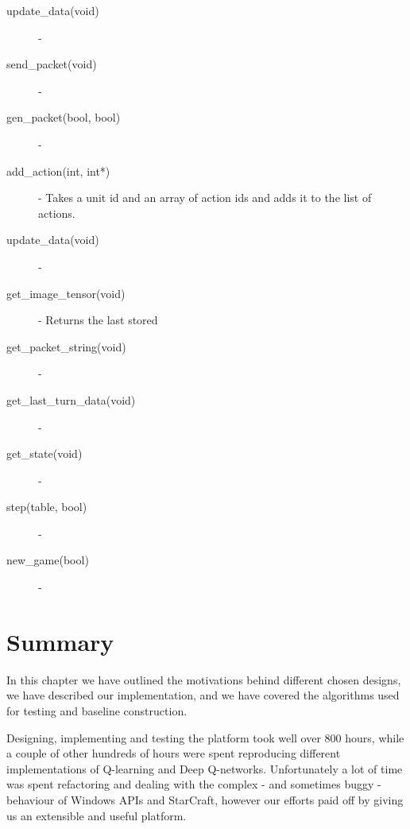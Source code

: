 \begin{description}
\item [update\_data(void)] -
\item [send\_packet(void)] -
\item [gen\_packet(bool, bool)] -
\item [add\_action(int, int*)] - Takes a unit id and an array of action ids and
  adds it to the list of actions.
\item [update\_data(void)] -
\item [get\_image\_tensor(void)] - Returns the last stored 
\item [get\_packet\_string(void)] -
\item [get\_last\_turn\_data(void)] -
\item [get\_state(void)] -
\item [step(table, bool)] -
\item [new\_game(bool)] -
\end{description}
 
\section{Summary}

In this chapter we have outlined the motivations behind different chosen
designs, we have described our implementation, and we have covered the algorithms
used for testing and baseline construction.

Designing, implementing and testing the platform took well over 800 hours, while
a couple of other hundreds of hours were spent reproducing different
implementations of Q-learning and Deep Q-networks. Unfortunately a lot of time
was spent refactoring and dealing with the complex - and sometimes buggy -
behaviour of Windows APIs and StarCraft, however our efforts paid off by giving
us an extensible and useful platform.